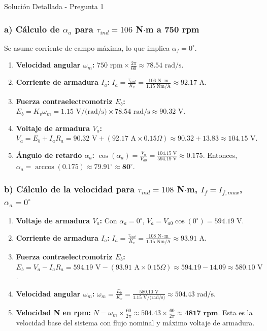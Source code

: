 \documentclass[12pt]{article}
\begin{document}
\begin{solutionbox}{Solución Detallada - Pregunta 1}
\subsubsection*{a) Cálculo de $\alpha_a$ para $\tau_{ind} = 106$ N$\cdot$m a 750 rpm}
Se asume corriente de campo máxima, lo que implica $\alpha_f = 0^{\circ}$.
\begin{enumerate}
    \item \textbf{Velocidad angular $\omega_m$:} $750 \text{ rpm} \times \frac{2\pi}{60} \approx 78.54 \text{ rad/s}$.
    \item \textbf{Corriente de armadura $I_a$:} $I_a = \frac{\tau_{ind}}{K_v} = \frac{106 \text{ N}\cdot\text{m}}{1.15 \text{ Nm/A}} \approx 92.17 \text{ A}$.
    \item \textbf{Fuerza contraelectromotriz $E_b$:} $E_b = K_v \omega_m = 1.15 \text{ V/(rad/s)} \times 78.54 \text{ rad/s} \approx 90.32 \text{ V}$.
    \item \textbf{Voltaje de armadura $V_a$:} $V_a = E_b + I_a R_a = 90.32 \text{ V} + (92.17 \text{ A} \times 0.15 \Omega) \approx 90.32 + 13.83 \approx 104.15 \text{ V}$.
    \item \textbf{Ángulo de retardo $\alpha_a$:} $\cos(\alpha_a) = \frac{V_a}{V_{a0}} = \frac{104.15 \text{ V}}{594.19 \text{ V}} \approx 0.175$. Entonces, $\alpha_a = \arccos(0.175) \approx 79.91^{\circ} \approx \mathbf{80^{\circ}}$.
\end{enumerate}

\subsubsection*{b) Cálculo de la velocidad para $\tau_{ind} = 108$ N$\cdot$m, $I_f = I_{f,max}$, $\alpha_a = 0^{\circ}$}
\begin{enumerate}
    \item \textbf{Voltaje de armadura $V_a$:} Con $\alpha_a = 0^{\circ}$, $V_a = V_{a0} \cos(0^{\circ}) = 594.19 \text{ V}$.
    \item \textbf{Corriente de armadura $I_a$:} $I_a = \frac{\tau_{ind}}{K_v} = \frac{108 \text{ N}\cdot\text{m}}{1.15 \text{ Nm/A}} \approx 93.91 \text{ A}$.
    \item \textbf{Fuerza contraelectromotriz $E_b$:} $E_b = V_a - I_a R_a = 594.19 \text{ V} - (93.91 \text{ A} \times 0.15 \Omega) \approx 594.19 - 14.09 \approx 580.10 \text{ V}$.
    \item \textbf{Velocidad angular $\omega_m$:} $\omega_m = \frac{E_b}{K_v} = \frac{580.10 \text{ V}}{1.15 \text{ V/(rad/s)}} \approx 504.43 \text{ rad/s}$.
    \item \textbf{Velocidad N en rpm:} $N = \omega_m \times \frac{60}{2\pi} \approx 504.43 \times \frac{60}{2\pi} \approx \mathbf{4817 \text{ rpm}}$. Esta es la velocidad base del sistema con flujo nominal y máximo voltaje de armadura.
\end{enumerate}


\end{solutionbox}
\end{document}
